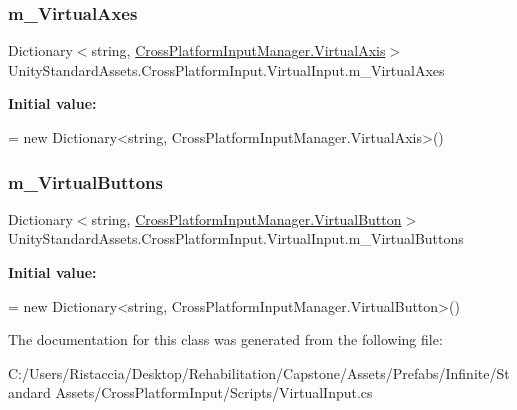 \subsubsection{\texorpdfstring{m\+\_\+\+Virtual\+Axes}{m\_VirtualAxes}}
{\footnotesize\ttfamily Dictionary$<$string, \hyperlink{class_unity_standard_assets_1_1_cross_platform_input_1_1_cross_platform_input_manager_1_1_virtual_axis}{Cross\+Platform\+Input\+Manager.\+Virtual\+Axis}$>$ Unity\+Standard\+Assets.\+Cross\+Platform\+Input.\+Virtual\+Input.\+m\+\_\+\+Virtual\+Axes\hspace{0.3cm}{\ttfamily [protected]}}

{\bfseries Initial value\+:}
\begin{DoxyCode}
=
            \textcolor{keyword}{new} Dictionary<string, CrossPlatformInputManager.VirtualAxis>()
\end{DoxyCode}
\mbox{\label{class_unity_standard_assets_1_1_cross_platform_input_1_1_virtual_input_adbc824b5db08f6929aee3be874bc76cb}} 
\subsubsection{\texorpdfstring{m\+\_\+\+Virtual\+Buttons}{m\_VirtualButtons}}
{\footnotesize\ttfamily Dictionary$<$string, \hyperlink{class_unity_standard_assets_1_1_cross_platform_input_1_1_cross_platform_input_manager_1_1_virtual_button}{Cross\+Platform\+Input\+Manager.\+Virtual\+Button}$>$ Unity\+Standard\+Assets.\+Cross\+Platform\+Input.\+Virtual\+Input.\+m\+\_\+\+Virtual\+Buttons\hspace{0.3cm}{\ttfamily [protected]}}

{\bfseries Initial value\+:}
\begin{DoxyCode}
=
            \textcolor{keyword}{new} Dictionary<string, CrossPlatformInputManager.VirtualButton>()
\end{DoxyCode}


The documentation for this class was generated from the following file\+:\begin{DoxyCompactItemize}
\item 
C\+:/\+Users/\+Ristaccia/\+Desktop/\+Rehabilitation/\+Capstone/\+Assets/\+Prefabs/\+Infinite/\+Standard Assets/\+Cross\+Platform\+Input/\+Scripts/Virtual\+Input.\+cs\end{DoxyCompactItemize}

